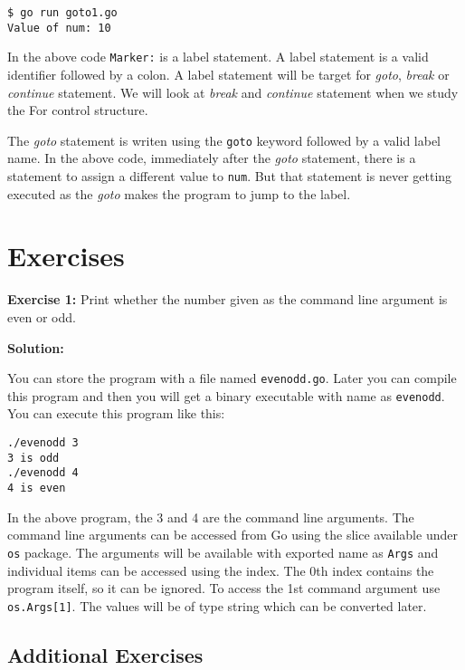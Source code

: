 \begin{lstlisting}[caption=Goto example program output]
$ go run goto1.go
Value of num: 10
\end{lstlisting}

In the above code \texttt{Marker:} is a label statement.  A label
statement is a valid identifier followed by a colon.  A label
statement will be target for \textit{goto}, \textit{break}
or \textit{continue} statement.  We will look at \textit{break}
and \textit{continue} statement when we study the For control
structure.

The \textit{goto} statement is writen using the \texttt{goto} keyword
followed by a valid label name.  In the above code, immediately after
the \textit{goto} statement, there is a statement to assign a
different value to \texttt{num}.  But that statement is never getting
executed as the \textit{goto} makes the program to jump to the label.

\section{Exercises}

\textbf{Exercise 1:} Print whether the number given as the command line
argument is even or odd.

\textbf{Solution:}

You can store the program with a file named \texttt{evenodd.go}.
Later you can compile this program and then you will get a binary
executable with name as \texttt{evenodd}.  You can execute this
program like this:

\begin{lstlisting}[numbers=none]
./evenodd 3
3 is odd
./evenodd 4
4 is even
\end{lstlisting}

In the above program, the 3 and 4 are the command line arguments.  The
command line arguments can be accessed from Go using the slice
available under \texttt{os} package.  The arguments will be available
with exported name as \texttt{Args} and individual items can be
accessed using the index.  The 0th index contains the program itself,
so it can be ignored.  To access the 1st command argument
use \texttt{os.Args[1]}.  The values will be of type string which can
be converted later.



\subsection{Additional Exercises}

